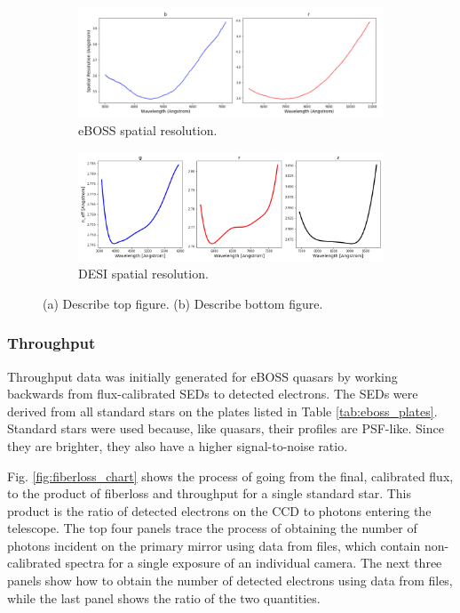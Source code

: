 \begin{figure}[h]
\centering
\begin{subfigure}[b]{0.55\textwidth}
   \includegraphics[width=14cm]{images/specsim/eboss_neff.png}
   \caption{eBOSS spatial resolution.}
   \label{fig:eboss_neff} 
\end{subfigure}

\begin{subfigure}[b]{0.55\textwidth}
   \includegraphics[width=14cm]{images/specsim/desi_neff.png}
   \caption{DESI spatial resolution.}
   \label{fig:desi_neff}
\end{subfigure}
\caption[Two numerical solutions]{(a) Describe top figure. (b) Describe bottom figure.}
\label{fig:neff}
\end{figure}


\subsubsection{Throughput}

Throughput data was initially generated for eBOSS quasars by working backwards from flux-calibrated SEDs to detected electrons. The SEDs were derived from all standard stars on the plates listed in Table \ref{tab:eboss_plates}. Standard stars were used because, like quasars, their profiles are PSF-like. Since they are brighter, they also have a higher signal-to-noise ratio. 

Fig. \ref{fig:fiberloss_chart} shows the process of going from the final, calibrated flux, to the product of fiberloss and throughput for a single standard star. This product is the ratio of detected electrons on the CCD to photons entering the telescope. The top four panels trace the process of obtaining the number of photons incident on the primary mirror using data from  files, which contain non-calibrated spectra for a single exposure of an individual camera. The next three panels show how to obtain the number of detected electrons using data from  files, while the last panel shows the ratio of the two quantities. 

